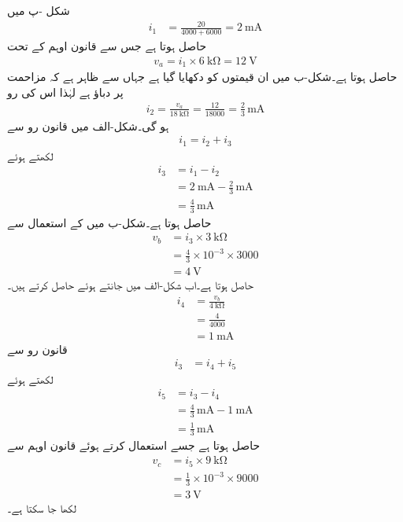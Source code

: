 شکل -پ میں
\begin{align*}
i_1&=\frac{20}{4000+6000}=\SI{2}{\milli\ampere}
\end{align*}
حاصل ہوتا ہے جس سے قانون اوہم کے تحت
\begin{align*}
v_a=i_1 \times \SI{6}{\kilo\ohm}=\SI{12}{\volt}
\end{align*}
حاصل ہوتا ہے۔شکل-ب میں ان قیمتوں کو دکھایا گیا ہے جہاں سے ظاہر ہے کہ  مزاحمت پر  دباؤ ہے لہٰذا اس کی رو
\begin{align*}
i_2=\frac{v_a}{\SI{18}{\kilo\ohm}}=\frac{12}{18000}=\frac{2}{3} \, \si{\milli\ampere}
\end{align*}
ہو گی۔شکل-الف میں قانون رو سے 
\begin{align*}
i_1=i_2+i_3
\end{align*}
لکھتے ہوئے
\begin{align*}
i_3&=i_1-i_2\\
&=\SI{2}{\milli\ampere}-\frac{2}{3}\, \si{\milli\ampere}\\
&=\frac{4}{3}\, \si{\milli\ampere}
\end{align*}
حاصل ہوتا ہے۔شکل-ب میں  کے استعمال سے
\begin{align*}
v_b&=i_3 \times \SI{3}{\kilo\ohm}\\
&=\frac{4}{3}\times 10^{-3} \times 3000\\
&=\SI{4}{\volt}
\end{align*}
حاصل ہوتا ہے۔اب شکل-الف میں  جانتے ہوئے  حاصل کرتے ہیں۔
\begin{align*}
i_4&=\frac{v_b}{\SI{4}{\kilo\ohm}}\\
&=\frac{4}{4000}\\
&=\SI{1}{\milli\ampere}
\end{align*}
قانون رو سے
\begin{align*}
i_3&=i_4+i_5
\end{align*}
لکھتے ہوئے
\begin{align*}
i_5&=i_3-i_4\\
&=\frac{4}{3}\, \si{\milli\ampere}-\SI{1}{\milli\ampere}\\
&=\frac{1}{3} \, \si{\milli\ampere}
\end{align*}
حاصل ہوتا ہے جسے استعمال کرتے ہوئے قانون اوہم سے
\begin{align*}
v_c&=i_5 \times \SI{9}{\kilo\ohm}\\
&=\frac{1}{3} \times 10^{-3} \times 9000\\
&=\SI{3}{\volt}
\end{align*}
لکھا جا سکتا ہے۔

